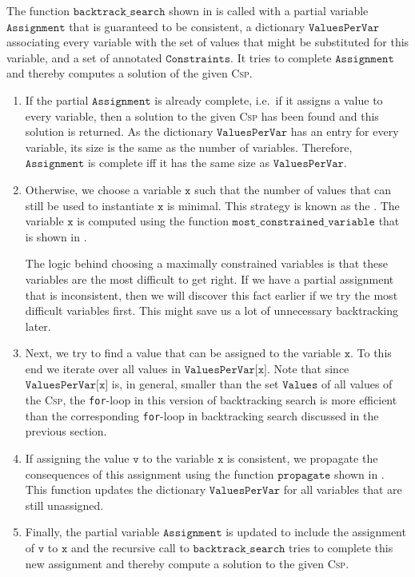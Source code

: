 The function $\texttt{backtrack\_search}$ shown in  is called with a
partial variable $\texttt{Assignment}$ that is guaranteed to be consistent, a dictionary
$\texttt{ValuesPerVar}$ associating every variable with the set of values that might be substituted for this
variable, and a
set of annotated $\texttt{Constraints}$.  It tries to complete $\texttt{Assignment}$ and thereby computes a
solution of the given \textsc{Csp}.  
\begin{enumerate}
\item If the partial $\texttt{Assignment}$ is already complete, i.e.~if it assigns a value to every variable, 
      then a solution to the given \textsc{Csp} has been found and this solution is returned.  As the
      dictionary $\texttt{ValuesPerVar}$ has an entry for every variable, its size is the same as the number of
      variables. Therefore, $\texttt{Assignment}$ is complete iff it has the same size as $\texttt{ValuesPerVar}$.
\item Otherwise, we choose a variable $\texttt{x}$ such that the number of values that can still be used to
      instantiate $\texttt{x}$ is minimal.  This strategy is known as the . 
      The variable $\texttt{x}$ is computed using the function
      $\texttt{most\_constrained\_variable}$ that is shown in .
      
      The logic behind choosing a maximally constrained variables is that these variables are the most
      difficult to get right.  If we have a partial assignment that is inconsistent, then we will discover this
      fact earlier if we try the most difficult variables first.  This might save us a lot of unnecessary
      backtracking later. 
\item Next, we try to find a value that can be assigned to the variable $\texttt{x}$.
      To this end we iterate over all values in $\texttt{ValuesPerVar[x]}$.
      Note that since $\texttt{ValuesPerVar[x]}$ is, in general, smaller than the set $\texttt{Values}$ of all values of the
      \textsc{Csp}, the \texttt{for}-loop in this version of backtracking search is more efficient than the
      corresponding \texttt{for}-loop in backtracking search discussed in the previous section. 
\item If assigning the value $\texttt{v}$ to the variable $\texttt{x}$ is consistent, we propagate the consequences
      of this assignment using the function $\texttt{propagate}$ shown in
      .
      This function updates the dictionary $\mathtt{ValuesPerVar}$ for all variables that are still unassigned.
\item Finally, the partial variable $\texttt{Assignment}$ is updated to include the assignment of 
      $\texttt{v}$ to $\texttt{x}$ and the recursive call to $\texttt{backtrack\_search}$ tries to complete this new
      assignment and thereby compute a solution to the given \textsc{Csp}. 
\end{enumerate}

